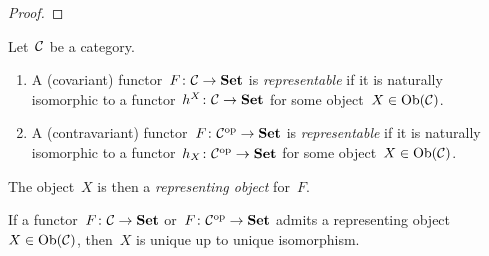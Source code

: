 \begin{proof}
\end{proof}


\begin{definition}
  Let~$\mathcal{C}$ be a category.
  \begin{enumerate}
    \item
      A (covariant) functor~$F \colon \mathcal{C} \to \mathbf{Set}$ is \emph{representable} if it is naturally isomorphic to a functor~$h^X \colon \mathcal{C} \to \mathbf{Set}$ for some object~$X \in \operatorname{Ob}(\mathcal{C})$.
    \item
      A (contravariant) functor~$F \colon \mathcal{C}^{\mathrm{op}} \to \mathbf{Set}$ is \emph{representable} if it is naturally isomorphic to a functor~$h_X \colon \mathcal{C}^{\mathrm{op}} \to \mathbf{Set}$ for some object~$X \in \operatorname{Ob}(\mathcal{C})$.
  \end{enumerate}
  The object~$X$ is then a \emph{representing object} for~$F$.
\end{definition}


\begin{remark*}
  If a functor~$F \colon \mathcal{C} \to \mathbf{Set}$ or~$F \colon \mathcal{C}^{\mathrm{op}} \to \mathbf{Set}$ admits a representing object~$X \in \operatorname{Ob}(\mathcal{C})$, then~$X$ is unique up to unique isomorphism.
\end{remark*}





